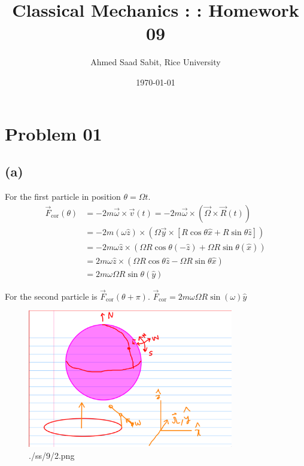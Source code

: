 \documentclass[letter, 10pts]{article}
\title{Classical Mechanics : : Homework 09}
\author{Ahmed Saad Sabit, Rice University}
\date{\today}
\begin{document}
\maketitle






























\section*{Problem 01} 
\subsection*{(a)} 
For the first particle in position $\theta = \Omega t$. 
\begin{align*}
\vec{F}_\text{cor} (\theta) &= - 2m \vec{\omega} \times \vec{v}(t) = - 2m \vec{\omega} \times  (\vec{\Omega} \times \vec{R}(t) )\\
&=
- 2 m (\omega \hat{z}) \times  
\left(
\Omega \vec{y} \times 
\left[
R \cos \theta \hat{x} + R \sin \theta \hat{z}
\right]
\right)
\\
&= 
- 2m \omega \hat{z} \times \left(
\Omega R \cos \theta(- \hat{z}) + \Omega R \sin  \theta (\hat{x})
\right)
\\
&= 
2m \omega \hat{z} \times \left(
\Omega R \cos \theta\hat{z} - \Omega R \sin  \theta  \hat{x}
\right)
\\
&= 
2 m \omega \Omega R \sin \theta( \hat{y})
\end{align*}

For the second particle is $\vec{F}_\text{cor}(\theta + \pi )$.  $\vec{F}_\text{cor} = 2 m \omega \Omega R \sin(\omega) \hat{y}$




\begin{figure}[H]
	\centering
	\includegraphics[width=0.8\textwidth]{./ss/9/2.png}
	\caption{./ss/9/2.png}
	\label{fig:-ss-9-2-png}
\end{figure}
\end{document}
